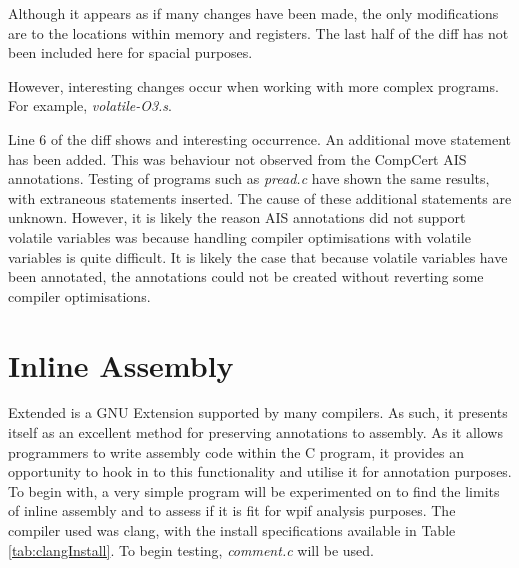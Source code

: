 

Although it appears as if many changes have been made, the only modifications are to the locations within memory and registers. The last half of the diff has not been included here for spacial purposes.

However, interesting changes occur when working with more complex programs. For example, \textit{volatile-O3.s}.



Line 6 of the diff shows and interesting occurrence. An additional move statement has been added. This was behaviour not observed from the CompCert AIS annotations. Testing of programs such as \textit{pread.c} have shown the same results, with extraneous statements inserted. The cause of these additional statements are unknown. However, it is likely the reason AIS annotations did not support volatile variables was because handling compiler optimisations with volatile variables is quite difficult. It is likely the case that because volatile variables have been annotated, the annotations could not be created without reverting some compiler optimisations. 

\section{Inline Assembly}
\label{sec:inlineAssembly}

Extended  is a GNU Extension supported by many compilers. As such, it presents itself as an excellent method for preserving annotations to assembly. As it allows programmers to write assembly code within the C program, it provides an opportunity to hook in to this functionality and utilise it for annotation purposes. To begin with, a very simple program will be experimented on to find the limits of inline assembly and to assess if it is fit for wpif analysis purposes. The compiler used was clang, with the install specifications available in Table \ref{tab:clangInstall}. To begin testing, \textit{comment.c} will be used.

